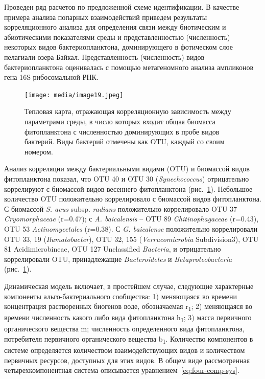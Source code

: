 \documentclass[a4paper,12pt,openany,final]{extreport}
\def\oldcaption{} \let\oldcaption=\caption
\def\caption{\stepcounter{captionsnum}\oldcaption}
\begin{document}
Проведен ряд расчетов по предложенной схеме идентификации. В качестве
примера анализа попарных взаимодействий приведем результаты
корреляционного анализа для определения связи между биотическим и
абиотическими показателями среды и представленностью (численность)
некоторых видов бактериопланктона, доминирующего в фотическом слое
пелагиали озера Байкал. Представленность (численность) видов
бактериопланктона оценивалась с помощью метагеномного анализа ампликонов
гена 16S рибосомальной РНК.

\begin{figure}\centering

\texttt{[image: media/image19.jpeg]}
\caption{Тепловая карта, отражающая корреляционную зависимость между
параметрами среды, в число которых входит общая биомасса фитопланктона с
численностью доминирующих в пробе видов бактерий. Виды бактерий отмечены
как OTU, каждый со своим номером.}\label{fig:heatmap-1}
\end{figure}

Анализ корреляции между бактериальными видами (OTU) и биомассой видов
фитопланктона показал, что OTU 40 и OTU 30 (\emph{Synechococcus})
отрицательно коррелируют с биомассой видов весеннего фитопланктона (рис.~\ref{fig:heatmap-1}). Небольшое количество OTU положительно коррелировало с биомассой
видов фитопланктона. С биомассой \emph{S. acus} subsp. \emph{radians}
положительно коррелировало OTU 37 \emph{Cryomorphaceae} (r=0.47); с
\emph{A. baicalensis} -- OTU 89 \emph{Chitinophagaceae} (r=0.43), OTU 53
\emph{Actinomycetales} (r=0.38). С \emph{G. baicalense} положительно
коррелировали OTU 33, 19 (\emph{Ilumatobacter}), OTU 32, 155
(\emph{Verrucomicrobia} Subdivision3), OTU 81 Acidimicrobineae, OTU 127
Unclassified \emph{Bacteria}, и отрицательно коррелировали OTU,
принадлежащие \emph{Bacteroidetes} и \emph{Betaproteobacteria} (рис.~\ref{fig:heatmap-1}).

Динамическая модель включает, в простейшем случае, следующие характерные
компоненты альго-бактериального сообщества: 1) меняющаяся во времени
концентрация растворенных биогенов воде, обозначаемая
r\textsubscript{1}; 2) меняющаяся во времени численность какого либо
вида фитопланктона h\textsubscript{1}; 3) масса первичного органического
вещества m; численность определенного вида фитопланктона, потребителя
первичного органического вещества b\textsubscript{1}. Количество
компонентов в системе определяется количеством взаимодействующих видов и
количеством первичных ресурсов, доступных для этих видов. В общем виде
рассмотренная четырехкомпонентная система описывается уравнением~\ref{eq:four-comp-sys}.
\end{document}
